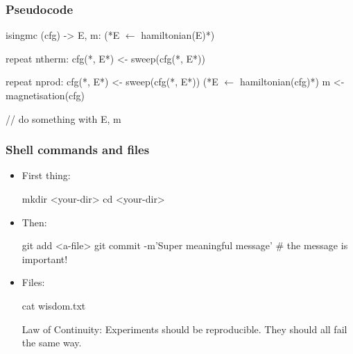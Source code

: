 \documentclass[mathserif, fleqn]{beamer}
\begin{document}
\begin{frame}[fragile]\frametitle{Pseudocode}
  \begin{aiphipseudo}[emph={isingmc}, caption={Some MC pseudocode}]
isingmc (cfg) -> E, m:
    (*\color{aiphigreen}E $\leftarrow$ hamiltonian(E)*)

    repeat ntherm:
        cfg(*\color{aiphigreen}, E*) <- sweep(cfg(*\color{aiphigreen}, E*))

    repeat nprod:
        cfg(*\color{aiphigreen}, E*) <- sweep(cfg(*\color{aiphigreen}, E*))
        (*\color{aiphired}E $\leftarrow$ hamiltonian(cfg)*)
        m <- magnetisation(cfg)

        // do something with E, m
  \end{aiphipseudo}
\end{frame}

\begin{frame}[fragile]\frametitle{Shell commands and files}
  \begin{itemize}
  \item First thing:
    \begin{shell}[]
mkdir <your-dir>
cd <your-dir>
    \end{shell}
  \item Then:
    \begin{shell}[]
git add <a-file>
git commit -m'Super meaningful message'  # the message is important!
    \end{shell}
  \item Files:
    \begin{shell}[]
cat wisdom.txt
    \end{shell}
    \begin{file}[]
Law of Continuity:
    Experiments should be reproducible.  They should all fail the same way.
    \end{file}
  \end{itemize}
\end{frame}
\end{document}
